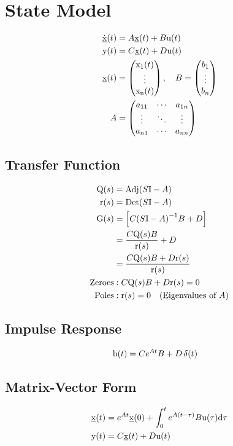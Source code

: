 \section*{State Model}
\begin{align*}
    \func{\dot{\underline{x}}}[t] &= A \func{\underline{x}}[t] + B \func{u}[t] \\
    \func{y}[t] &= C \func{\underline{x}}[t] + D \func{u}[t] \\
    \func{\underline{x}}[t] &= \crvector{\func{x_1}[t] \\ \vdots \\ \func{x_n}[t]},\quad B = \crvector{b_1 \\ \vdots \\ b_n} \\
    A &= \crvector{a_{11} & \cdots & a_{1n} \\ \vdots & \ddots & \vdots\\ a_{n1} & \cdots & a_{nn} }
\end{align*}

\subsection*{Transfer Function}
\begin{align*}
    \func{Q}[s] &= \func{Adj}[S \mathbb{I} - A] \\
    \func{r}[s] &= \func{Det}[S \mathbb{I} - A] \\
    \func{G}[s] &= \left[ C {(S \mathbb{I} - A)}^{-1} B + D \right] \\
                &= \frac{C \func{Q}[s] B}{\func{r}[s]} + D \\
                &= \frac{C \func{Q}[s] B + D \func{r}[s]}{\func{r}[s]} \\
    \text{Zeroes} &: C \func{Q}[s] B + D \func{r}[s] = 0 \\
    \text{Poles} &: \func{r}[s] = 0 \quad (\text{Eigenvalues of } A)
\end{align*}

\subsection*{Impulse Response}
\begin{align*}
    \func{h}[t] &= C e^{At} B + D\,\delta(t)
\end{align*}

\subsection*{Matrix-Vector Form}
\begin{align*}
    \func{\underline{x}}[t] &= e^{At}\func{\underline{x}}[0] + \intdef{0}{t}{e^{A(t-\tau)}B\func{u}[\tau]}{\tau} \\
    \func{y}[t] &= C\func{\underline{x}}[t] + D\func{u}[t]
\end{align*}
